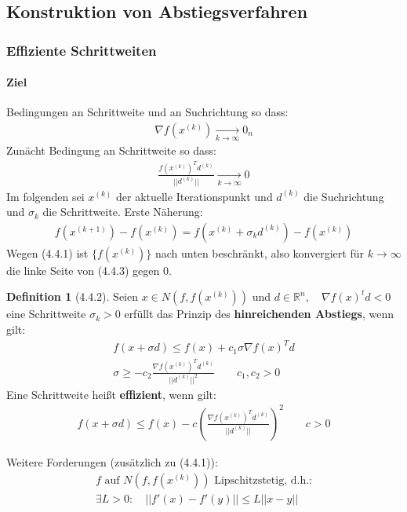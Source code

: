 \documentclass[ngerman,halfparskip]{scrartcl}
\theoremstyle{definition}
\newtheorem*{defin}{Definition}
\def\R{\mathbb R}
\begin{document}
\subsection*{Konstruktion von Abstiegsverfahren}
\subsubsection*{Effiziente Schrittweiten}
\paragraph{Ziel} Bedingungen an Schrittweite und an Suchrichtung so dass:
\begin{gather*}\tag{4.4.1}
\nabla f(x^{(k)})\xrightarrow[k\rightarrow \infty]{} 0_n
\end{gather*}
Zunächt Bedingung an Schrittweite so dass:
\begin{gather*}\tag{4.4.2}
\frac{f(x^{(k)})^Td^{(k)}}{||d^{(k)}||}\xrightarrow[k\rightarrow \infty]{} 0
\end{gather*}
Im folgenden sei $x^{(k)}$ der aktuelle Iterationspunkt und $d^{(k)}$ die Suchrichtung und $\sigma_k$ die Schrittweite. Erste Näherung:
\begin{gather*}\tag{4.4.3}
f(x^{(k+1)})-f(x^{(k)})=f(x^{(k)}+\sigma_kd^{(k)})-f(x^{(k)})
\end{gather*}
Wegen (4.4.1) ist $\{f(x^{(k)})\}$ nach unten beschränkt, also konvergiert für $k\rightarrow\infty$ die linke Seite von (4.4.3) gegen $0$.
\begin{defin}[4.4.2]
Seien $x\in N(f,f(x^{(k)}))$ und $d\in\R^n, \quad \nabla f (x)^t d<0$ eine Schrittweite $\sigma_k>0$ erfüllt das Prinzip des \textbf{hinreichenden Abstiegs}, wenn gilt:
\begin{gather*}\tag{4.4.7}
f(x+\sigma d)\leq f(x)+c_1\sigma\nabla f(x)^Td\\
\tag{4.4.8} \sigma \geq -c_2 \frac{\nabla f(x^{(k)})^Td^{(k)}}{||d^{(k)}||^2} \qquad c_1,c_2>0
\end{gather*}
Eine Schrittweite heißt \textbf{effizient}, wenn gilt:
\begin{gather*}
\tag{4.4.9} f(x+\sigma d)\leq f(x)-c\left( \frac{\nabla f(x^{(k)})^Td^{(k)}}{||d^{(k)}||} \right)^2 \qquad c>0
\end{gather*}
\end{defin}

Weitere Forderungen (zusätzlich zu (4.4.1)):
\begin{gather*}
\tag{4.4.10} f\text{ auf } N(f,f(x^{(k)})) \text{ Lipschitzstetig, d.h.:}\\
\exists L>0: \quad ||f'(x)-f'(y)||\leq L||x-y||
\end{gather*}
\end{document}
